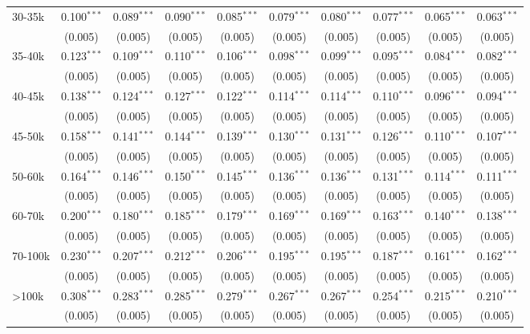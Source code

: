 \begin{table}[!htbp]
\begin{tabular}{@{\extracolsep{5pt}}lccccccccc}
  30-35k & 0.100$^{***}$ & 0.089$^{***}$ & 0.090$^{***}$ & 0.085$^{***}$ & 0.079$^{***}$ & 0.080$^{***}$ & 0.077$^{***}$ & 0.065$^{***}$ & 0.063$^{***}$ \\ 
  & (0.005) & (0.005) & (0.005) & (0.005) & (0.005) & (0.005) & (0.005) & (0.005) & (0.005) \\ 
  35-40k & 0.123$^{***}$ & 0.109$^{***}$ & 0.110$^{***}$ & 0.106$^{***}$ & 0.098$^{***}$ & 0.099$^{***}$ & 0.095$^{***}$ & 0.084$^{***}$ & 0.082$^{***}$ \\ 
  & (0.005) & (0.005) & (0.005) & (0.005) & (0.005) & (0.005) & (0.005) & (0.005) & (0.005) \\ 
  40-45k & 0.138$^{***}$ & 0.124$^{***}$ & 0.127$^{***}$ & 0.122$^{***}$ & 0.114$^{***}$ & 0.114$^{***}$ & 0.110$^{***}$ & 0.096$^{***}$ & 0.094$^{***}$ \\ 
  & (0.005) & (0.005) & (0.005) & (0.005) & (0.005) & (0.005) & (0.005) & (0.005) & (0.005) \\ 
  45-50k & 0.158$^{***}$ & 0.141$^{***}$ & 0.144$^{***}$ & 0.139$^{***}$ & 0.130$^{***}$ & 0.131$^{***}$ & 0.126$^{***}$ & 0.110$^{***}$ & 0.107$^{***}$ \\ 
  & (0.005) & (0.005) & (0.005) & (0.005) & (0.005) & (0.005) & (0.005) & (0.005) & (0.005) \\ 
  50-60k & 0.164$^{***}$ & 0.146$^{***}$ & 0.150$^{***}$ & 0.145$^{***}$ & 0.136$^{***}$ & 0.136$^{***}$ & 0.131$^{***}$ & 0.114$^{***}$ & 0.111$^{***}$ \\ 
  & (0.005) & (0.005) & (0.005) & (0.005) & (0.005) & (0.005) & (0.005) & (0.005) & (0.005) \\ 
  60-70k & 0.200$^{***}$ & 0.180$^{***}$ & 0.185$^{***}$ & 0.179$^{***}$ & 0.169$^{***}$ & 0.169$^{***}$ & 0.163$^{***}$ & 0.140$^{***}$ & 0.138$^{***}$ \\ 
  & (0.005) & (0.005) & (0.005) & (0.005) & (0.005) & (0.005) & (0.005) & (0.005) & (0.005) \\ 
  70-100k & 0.230$^{***}$ & 0.207$^{***}$ & 0.212$^{***}$ & 0.206$^{***}$ & 0.195$^{***}$ & 0.195$^{***}$ & 0.187$^{***}$ & 0.161$^{***}$ & 0.162$^{***}$ \\ 
  & (0.005) & (0.005) & (0.005) & (0.005) & (0.005) & (0.005) & (0.005) & (0.005) & (0.005) \\ 
  >100k & 0.308$^{***}$ & 0.283$^{***}$ & 0.285$^{***}$ & 0.279$^{***}$ & 0.267$^{***}$ & 0.267$^{***}$ & 0.254$^{***}$ & 0.215$^{***}$ & 0.210$^{***}$ \\ 
  & (0.005) & (0.005) & (0.005) & (0.005) & (0.005) & (0.005) & (0.005) & (0.005) & (0.005) \\ 

\end{tabular}
\end{table}
